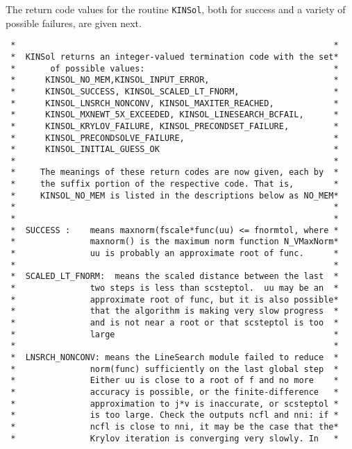 \documentclass[11pt]{article}
\begin{document}
The return code values for the routine {\tt KINSol}, both for success and a
variety of possible failures, are given next.

\small
\begin{verbatim}
 *                                                                *
 *  KINSol returns an integer-valued termination code with the set*
 *       of possible values:                                      *
 *      KINSOL_NO_MEM,KINSOL_INPUT_ERROR,                         *
 *      KINSOL_SUCCESS, KINSOL_SCALED_LT_FNORM,                   * 
 *      KINSOL_LNSRCH_NONCONV, KINSOL_MAXITER_REACHED,            *
 *      KINSOL_MXNEWT_5X_EXCEEDED, KINSOL_LINESEARCH_BCFAIL,      *
 *      KINSOL_KRYLOV_FAILURE, KINSOL_PRECONDSET_FAILURE,         *
 *      KINSOL_PRECONDSOLVE_FAILURE,                              *
 *      KINSOL_INITIAL_GUESS_OK                                   *
 *                                                                *
 *     The meanings of these return codes are now given, each by  *
 *     the suffix portion of the respective code. That is,        *
 *     KINSOL_NO_MEM is listed in the descriptions below as NO_MEM*
 *                                                                *
 *                                                                *
 *  SUCCESS :    means maxnorm(fscale*func(uu) <= fnormtol, where *
 *               maxnorm() is the maximum norm function N_VMaxNorm*
 *               uu is probably an approximate root of func.      *
 *                                                                *
 *  SCALED_LT_FNORM:  means the scaled distance between the last  *
 *               two steps is less than scsteptol.  uu may be an  *
 *               approximate root of func, but it is also possible*
 *               that the algorithm is making very slow progress  *
 *               and is not near a root or that scsteptol is too  *
 *               large                                            *
 *                                                                *
 *  LNSRCH_NONCONV: means the LineSearch module failed to reduce  *
 *               norm(func) sufficiently on the last global step  *
 *               Either uu is close to a root of f and no more    *
 *               accuracy is possible, or the finite-difference   *
 *               approximation to j*v is inaccurate, or scsteptol *
 *               is too large. Check the outputs ncfl and nni: if *
 *               ncfl is close to nni, it may be the case that the*
 *               Krylov iteration is converging very slowly. In   *

\end{verbatim}
\end{document}
